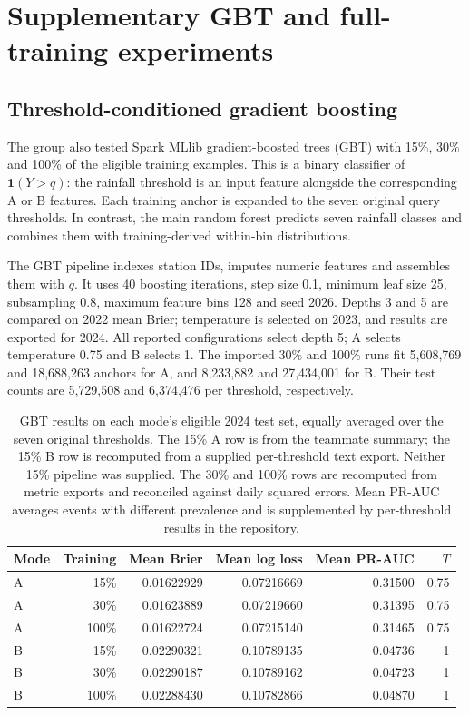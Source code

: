 \clearpage
\section{Supplementary GBT and full-training experiments}\label{sec:teammate}
\subsection{Threshold-conditioned gradient boosting}
The group also tested Spark MLlib gradient-boosted trees (GBT) with 15\%, 30\% and 100\% of the eligible training examples. This is a binary classifier of $\mathbf1(Y>q)$: the rainfall threshold is an input feature alongside the corresponding A or B features. Each training anchor is expanded to the seven original query thresholds. In contrast, the main random forest predicts seven rainfall classes and combines them with training-derived within-bin distributions.

The GBT pipeline indexes station IDs, imputes numeric features and assembles them with $q$. It uses 40 boosting iterations, step size 0.1, minimum leaf size 25, subsampling 0.8, maximum feature bins 128 and seed 2026. Depths 3 and 5 are compared on 2022 mean Brier; temperature is selected on 2023, and results are exported for 2024. All reported configurations select depth 5; A selects temperature 0.75 and B selects 1. The imported 30\% and 100\% runs fit 5,608,769 and 18,688,263 anchors for A, and 8,233,882 and 27,434,001 for B. Their test counts are 5,729,508 and 6,374,476 per threshold, respectively.

\begin{table}[!ht]\centering\small
\begin{tabular}{lrrrrr}\toprule
Mode & Training & Mean Brier & Mean log loss & Mean PR-AUC & $T$\\\midrule
A & 15\% & 0.01622929 & 0.07216669 & 0.31500 & 0.75 \\
A & 30\% & 0.01623889 & 0.07219660 & 0.31395 & 0.75 \\
A & 100\% & 0.01622724 & 0.07215140 & 0.31465 & 0.75 \\
B & 15\% & 0.02290321 & 0.10789135 & 0.04736 & 1 \\
B & 30\% & 0.02290187 & 0.10789162 & 0.04723 & 1 \\
B & 100\% & 0.02288430 & 0.10782866 & 0.04870 & 1 \\
\bottomrule\end{tabular}
\caption{GBT results on each mode's eligible 2024 test set, equally averaged over the seven original thresholds. The 15\% A row is from the teammate summary; the 15\% B row is recomputed from a supplied per-threshold text export. Neither 15\% pipeline was supplied. The 30\% and 100\% rows are recomputed from metric exports and reconciled against daily squared errors. Mean PR-AUC averages events with different prevalence and is supplemented by per-threshold results in the repository.}\label{tab:gbtsampling}
\end{table}
\FloatBarrier


